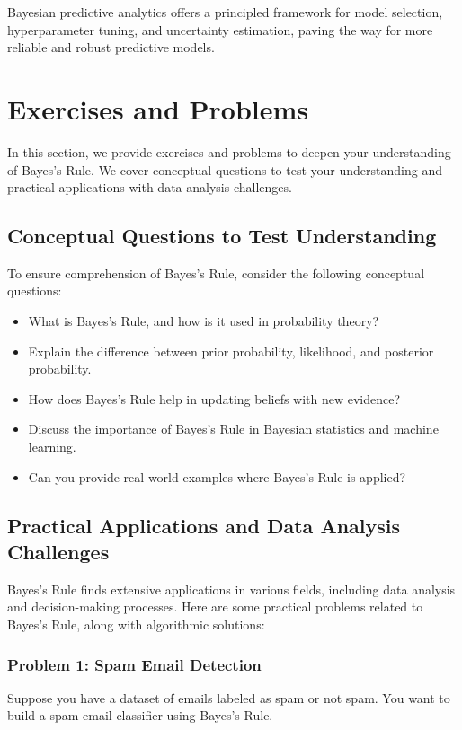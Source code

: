 \documentclass[12pt]{book} %
\begin{document}
Bayesian predictive analytics offers a principled framework for model selection, hyperparameter tuning, and uncertainty estimation, paving the way for more reliable and robust predictive models.


\section{Exercises and Problems}
In this section, we provide exercises and problems to deepen your understanding of Bayes's Rule. We cover conceptual questions to test your understanding and practical applications with data analysis challenges.

\subsection{Conceptual Questions to Test Understanding}
To ensure comprehension of Bayes's Rule, consider the following conceptual questions:

\begin{itemize}
    \item What is Bayes's Rule, and how is it used in probability theory?
    \item Explain the difference between prior probability, likelihood, and posterior probability.
    \item How does Bayes's Rule help in updating beliefs with new evidence?
    \item Discuss the importance of Bayes's Rule in Bayesian statistics and machine learning.
    \item Can you provide real-world examples where Bayes's Rule is applied?
\end{itemize}

\subsection{Practical Applications and Data Analysis Challenges}
Bayes's Rule finds extensive applications in various fields, including data analysis and decision-making processes. Here are some practical problems related to Bayes's Rule, along with algorithmic solutions:

\subsubsection{Problem 1: Spam Email Detection}
Suppose you have a dataset of emails labeled as spam or not spam. You want to build a spam email classifier using Bayes's Rule.
\end{document}
